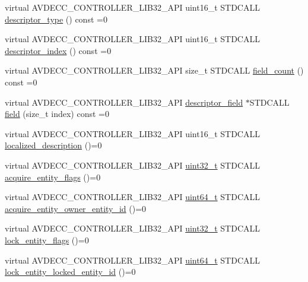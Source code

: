 \begin{DoxyCompactItemize}
\item 
virtual A\+V\+D\+E\+C\+C\+\_\+\+C\+O\+N\+T\+R\+O\+L\+L\+E\+R\+\_\+\+L\+I\+B32\+\_\+\+A\+PI uint16\+\_\+t S\+T\+D\+C\+A\+LL \hyperlink{classavdecc__lib_1_1descriptor__base_a5112b70022171063ec5d3242bee9910e}{descriptor\+\_\+type} () const =0
\item 
virtual A\+V\+D\+E\+C\+C\+\_\+\+C\+O\+N\+T\+R\+O\+L\+L\+E\+R\+\_\+\+L\+I\+B32\+\_\+\+A\+PI uint16\+\_\+t S\+T\+D\+C\+A\+LL \hyperlink{classavdecc__lib_1_1descriptor__base_a7eed5583bffdf72d89021b188648c1b5}{descriptor\+\_\+index} () const =0
\item 
virtual A\+V\+D\+E\+C\+C\+\_\+\+C\+O\+N\+T\+R\+O\+L\+L\+E\+R\+\_\+\+L\+I\+B32\+\_\+\+A\+PI size\+\_\+t S\+T\+D\+C\+A\+LL \hyperlink{classavdecc__lib_1_1descriptor__base_ab1edf4996377ed957088a7b3b16aca7d}{field\+\_\+count} () const =0
\item 
virtual A\+V\+D\+E\+C\+C\+\_\+\+C\+O\+N\+T\+R\+O\+L\+L\+E\+R\+\_\+\+L\+I\+B32\+\_\+\+A\+PI \hyperlink{classavdecc__lib_1_1descriptor__field}{descriptor\+\_\+field} $\ast$S\+T\+D\+C\+A\+LL \hyperlink{classavdecc__lib_1_1descriptor__base_aa3716832eed0b6f6dcfba358c5d2c601}{field} (size\+\_\+t index) const =0
\item 
virtual A\+V\+D\+E\+C\+C\+\_\+\+C\+O\+N\+T\+R\+O\+L\+L\+E\+R\+\_\+\+L\+I\+B32\+\_\+\+A\+PI uint16\+\_\+t S\+T\+D\+C\+A\+LL \hyperlink{classavdecc__lib_1_1descriptor__base_a1fb9de45567df344090a1407aa6b775f}{localized\+\_\+description} ()=0
\item 
virtual A\+V\+D\+E\+C\+C\+\_\+\+C\+O\+N\+T\+R\+O\+L\+L\+E\+R\+\_\+\+L\+I\+B32\+\_\+\+A\+PI \hyperlink{parse_8c_a6eb1e68cc391dd753bc8ce896dbb8315}{uint32\+\_\+t} S\+T\+D\+C\+A\+LL \hyperlink{classavdecc__lib_1_1descriptor__base_a42f2a796375edd05c8d29856c018042d}{acquire\+\_\+entity\+\_\+flags} ()=0
\item 
virtual A\+V\+D\+E\+C\+C\+\_\+\+C\+O\+N\+T\+R\+O\+L\+L\+E\+R\+\_\+\+L\+I\+B32\+\_\+\+A\+PI \hyperlink{parse_8c_aec6fcb673ff035718c238c8c9d544c47}{uint64\+\_\+t} S\+T\+D\+C\+A\+LL \hyperlink{classavdecc__lib_1_1descriptor__base_a6480d803970d505ce7a9b429a6eb71bd}{acquire\+\_\+entity\+\_\+owner\+\_\+entity\+\_\+id} ()=0
\item 
virtual A\+V\+D\+E\+C\+C\+\_\+\+C\+O\+N\+T\+R\+O\+L\+L\+E\+R\+\_\+\+L\+I\+B32\+\_\+\+A\+PI \hyperlink{parse_8c_a6eb1e68cc391dd753bc8ce896dbb8315}{uint32\+\_\+t} S\+T\+D\+C\+A\+LL \hyperlink{classavdecc__lib_1_1descriptor__base_a757e66272bba4c52cefa914df8c60bb5}{lock\+\_\+entity\+\_\+flags} ()=0
\item 
virtual A\+V\+D\+E\+C\+C\+\_\+\+C\+O\+N\+T\+R\+O\+L\+L\+E\+R\+\_\+\+L\+I\+B32\+\_\+\+A\+PI \hyperlink{parse_8c_aec6fcb673ff035718c238c8c9d544c47}{uint64\+\_\+t} S\+T\+D\+C\+A\+LL \hyperlink{classavdecc__lib_1_1descriptor__base_a052b47529d0e60ca87894159fcb65e14}{lock\+\_\+entity\+\_\+locked\+\_\+entity\+\_\+id} ()=0

\end{DoxyCompactItemize}
